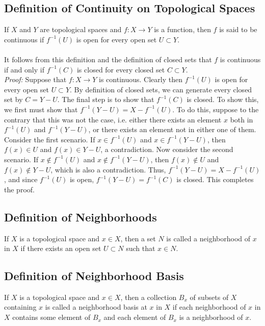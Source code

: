 \documentclass{article}
\begin{document}
	\subsection{Definition of Continuity on Topological Spaces}
	If $X$ and $Y$ are topological spaces and $f: X \to Y$ is a function, then $f$ is said to be continuous if $f^{-1}(U)$ is open for every open set $U \subset Y$.
	\\ \\
	\noindent
	It follows from this definition and the definition of closed sets that $f$ is continuous if and only if $f^{-1}(C)$ is closed for every closed set $C \subset Y$.
	\\
	\noindent \textit{Proof:}
	Suppose that $f: X \to Y$ is continuous. Clearly then $f^{-1}(U)$ is open for every open set $U \subset Y$. By definition of closed sets, we can generate every closed set by $C = Y - U$. The final step is to show that $f^{-1}(C)$ is closed. To show this, we first must show that $f^{-1}(Y - U) = X - f^{-1}(U)$. To do this, suppose to the contrary that this was not the case, i.e. either there exists an element $x$ both in $f^{-1}(U)$ and $f^{-1}(Y - U)$, or there exists an element not in either one of them. Consider the first scenario. If $x \in f^{-1}(U)$ and $x \in f^{-1}(Y - U)$, then $f(x) \in U$ and $f(x) \in Y - U$, a contradiction. Now consider the second scenario. If $x \notin f^{-1}(U)$ and $x \notin f^{-1}(Y - U)$, then $f(x) \notin U$ and $f(x) \notin Y - U$, which is also a contradiction. Thus, $f^{-1}(Y - U) = X - f^{-1}(U)$, and since $f^{-1}(U)$ is open, $f^{-1}(Y - U) = f^{-1}(C)$ is closed. This completes the proof.
	
	\subsection{Definition of Neighborhoods}
	If $X$ is a topological space and $x \in X$, then a set $N$ is called a neighborhood of $x$ in $X$ if there exists an open set $U \subset N$ such that $x \in N$.
	
	\subsection{Definition of Neighborhood Basis}
	If $X$ is a topological space and $x \in X$, then a collection $B_x$ of subsets of $X$ containing $x$ is called a neighborhood basis at $x$ in $X$ if each neighborhood of $x$ in $X$ contains some element of $B_x$ and each element of $B_x$ is a neighborhood of $x$.
	
\end{document}
